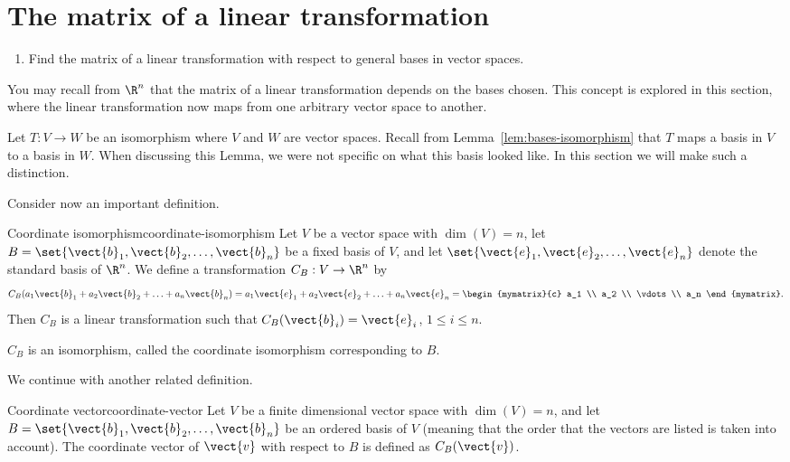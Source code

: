 \section{The matrix of a linear transformation}

\begin{outcome}
  \begin{enumerate}
  \item Find the matrix of a linear transformation with respect to
    general bases in vector spaces.
  \end{enumerate}
\end{outcome}

You may recall from $\R^n$ that the matrix of a linear transformation depends on the bases chosen. This concept is explored in this section, where the linear transformation now maps from one arbitrary vector space to another.

Let $T: V \to W$ be an isomorphism where $V$ and $W$ are vector spaces. Recall from Lemma~\ref{lem:bases-isomorphism} that $T$ maps a basis in $V$ to a basis in $W$. When discussing this Lemma, we were not specific on what this basis looked like. In this section we will make such a distinction.

Consider now an important definition.

\begin{definition}{Coordinate isomorphism}{coordinate-isomorphism}
Let $V$ be a vector space with $\dim(V)=n$, let $B=\set{\vect{b}_1, \vect{b}_2, \ldots, \vect{b}_n}$ be a fixed basis of $V$,
and let $\set{\vect{e}_1, \vect{e}_2, \ldots, \vect{e}_n}$
denote the standard basis of $\R^n$.
We define a transformation $C_B:V\to\R^n$ by
\[
C_B(a_1\vect{b}_1 + a_2\vect{b}_2 + \ldots + a_n\vect{b}_n)
=
a_1\vect{e}_1 + a_2\vect{e}_2 + \ldots + a_n\vect{e}_n
=
\begin{mymatrix}{c} a_1 \\ a_2 \\ \vdots \\ a_n
\end{mymatrix}.\]
Then $C_B$ is a linear transformation
such that
$C_B(\vect{b}_i)=\vect{e}_i$, $1\leq i\leq n$.

$C_B$ is an isomorphism, called
the coordinate isomorphism corresponding to $B$.
\end{definition}

We continue with another related definition.

\begin{definition}{Coordinate vector}{coordinate-vector}
Let $V$ be a finite dimensional vector space with $\dim(V)=n$, and
let $B=\set{\vect{b}_1, \vect{b}_2, \ldots, \vect{b}_n}$ be an ordered basis of $V$ (meaning that the order that the
vectors are listed is taken into account).
The coordinate vector of $\vect{v}$ with respect to $B$ is defined
as $C_B(\vect{v})$.
\end{definition}

